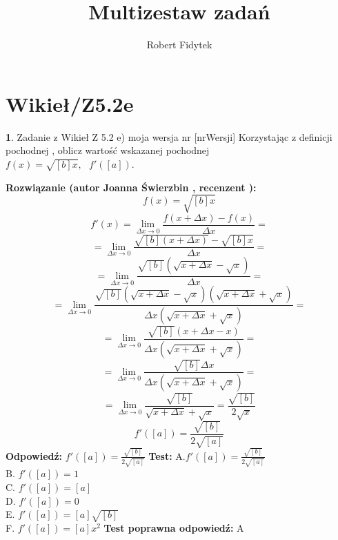 \documentclass[12pt, a4paper]{article}
\title{Multizestaw zadań}
\author{Robert Fidytek}
\date{}
\theoremstyle{definition} %
\newtheorem{zad}{}
\newcommand{\kategoria}[1]{\section{#1}} %
\newcommand{\zadStart}[1]{\begin{zad}#1\newline} %
\newcommand{\zadStop}{\end{zad}}   %
\newcommand{\rozwStart}[2]{\noindent \textbf{Rozwiązanie (autor #1 , recenzent #2): }\newline} %
\newcommand{\rozwStop}{\newline}                                            %
\newcommand{\odpStart}{\noindent \textbf{Odpowiedź:}\newline}    %
\newcommand{\odpStop}{\newline}                                             %
\newcommand{\testStart}{\noindent \textbf{Test:}\newline} %
\newcommand{\testStop}{\newline} %
\newcommand{\kluczStart}{\noindent \textbf{Test poprawna odpowiedź:}\newline} %
\newcommand{\kluczStop}{\newline} %
\begin{document}
\maketitle


\kategoria{Wikieł/Z5.2e}
\zadStart{Zadanie z Wikieł Z 5.2 e) moja wersja nr [nrWersji]}
Korzystając z definicji pochodnej , oblicz wartość wskazanej pochodnej \\ $f(x)=\sqrt{[b]x}, \ \ \ f'([a])$.
\zadStop
\rozwStart{Joanna Świerzbin}{}
$$f(x)=\sqrt{[b]x}$$
$$f'(x)=\lim_{\Delta x \rightarrow 0} \frac{f(x+\Delta x)-f(x)}{\Delta x} = $$ 
$$ =\lim_{\Delta x \rightarrow 0} \frac{\sqrt{[b](x+\Delta x)}-\sqrt{[b]x}}{\Delta x} = $$
$$ =\lim_{\Delta x \rightarrow 0} \frac{\sqrt{[b]}(\sqrt{x+\Delta x}-\sqrt{x})}{\Delta x} = $$
$$ =\lim_{\Delta x \rightarrow 0} \frac{\sqrt{[b]}(\sqrt{x+\Delta x}-\sqrt{x})(\sqrt{x+\Delta x}+\sqrt{x})}{\Delta x(\sqrt{x+\Delta x}+\sqrt{x})} = $$
$$ =\lim_{\Delta x \rightarrow 0} \frac{\sqrt{[b]}(x+\Delta x-x)}{\Delta x(\sqrt{x+\Delta x}+\sqrt{x})} = $$
$$ =\lim_{\Delta x \rightarrow 0} \frac{\sqrt{[b]}\Delta x}{\Delta x (\sqrt{x+\Delta x}+\sqrt{x})} = $$
$$ =\lim_{\Delta x \rightarrow 0} \frac{\sqrt{[b]}}{\sqrt{x+\Delta x}+\sqrt{x}}  = \frac{\sqrt{[b]}}{2\sqrt{x}} $$
$$f'([a])=\frac{\sqrt{[b]}}{2\sqrt{[a]}} $$
\rozwStop
\odpStart
$f'([a])=\frac{\sqrt{[b]}}{2\sqrt{[a]}} $
\odpStop
\testStart
A.$f'([a])=\frac{\sqrt{[b]}}{2\sqrt{[a]}} $\\
B. $f'([a])=1$ \\
C. $f'([a])=[a]$  \\
D. $f'([a])=0$\\
E. $f'([a])=[a]\sqrt{[b]}$\\
F. $f'([a])=[a]x^2$
\testStop
\kluczStart
A
\kluczStop
\end{document}
